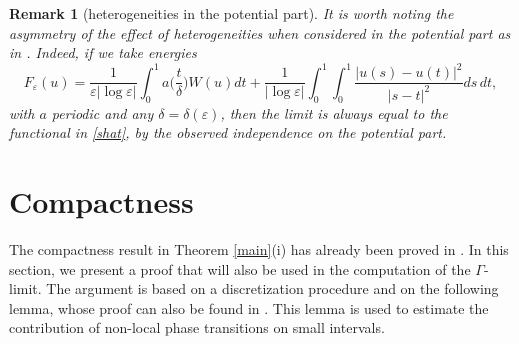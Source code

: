 \documentclass[12pt]{article}
\newtheorem{lemma}[definition]{Lemma}
\newtheorem{remark}[definition]{Remark}
\numberwithin{equation}{section}
\begin{document}
\begin{remark}[heterogeneities in the potential part]\rm
It is worth noting the asymmetry of the effect of heterogeneities when considered in the potential part as in \cite{MR4633768,MR4898688,MR4014392}. Indeed, if we take energies
$$
F_\varepsilon(u)=    \frac{1}{\varepsilon|\log{\varepsilon}|}\int_{0}^{1}a\Big(\frac t\delta\Big)W(u)dt+\frac{1}{|\log\varepsilon|}\int_{0}^{1}\int_{0}^{1}\frac{\left|u(s)-u(t)\right|^2}{\left|s-t\right|^2}ds\,dt,
$$
with $a$ periodic and any $\delta=\delta(\varepsilon)$, then the limit is always equal to the functional in \eqref{shat}, by the observed independence on the potential part. 
\end{remark}




\section{Compactness}
The compactness result in Theorem \ref{main}(i) has already been proved in \cite{ABS}.
In this section, we present a proof that will also be used in the computation of the $\Gamma$-limit.
The argument is based on a discretization procedure and on the following lemma, whose proof can also be found in \cite{ABS}. This lemma is used to estimate the contribution of non-local phase transitions on small intervals.
\end{document}
